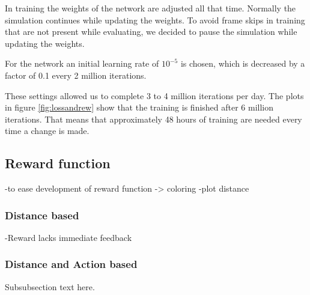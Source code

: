 In training the weights of the network are adjusted all that time. Normally the simulation continues while updating the weights. To avoid frame skips in training that are not present while evaluating, we decided to pause the simulation while updating the weights.

For the network an initial learning rate of $10^{-5}$ is chosen, which is decreased by a factor of 0.1 every 2 million iterations.

These settings allowed us to complete 3 to 4 million iterations per day. The plots in figure \ref{fig:lossandrew} show that the training is finished after 6 million iterations. That means that approximately 48 hours of training are needed every time a change is made. 

\subsection{Reward function}
-to ease development of reward function -> coloring
-plot distance 

\subsubsection{Distance based}
-Reward lacks immediate feedback
\subsubsection{Distance and Action based}
Subsubsection text here.